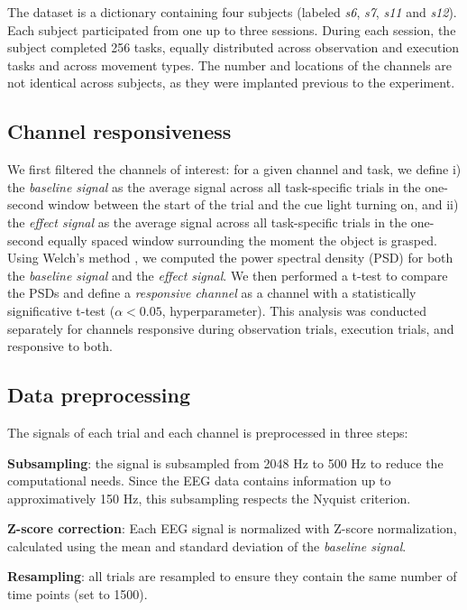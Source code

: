 \documentclass[10pt,conference,compsocconf]{IEEEtran}
\begin{document}
The dataset is a dictionary containing four subjects (labeled \textit{s6}, \textit{s7}, \textit{s11} and \textit{s12}). Each subject participated from one up to three sessions. During each session, the subject completed 256 tasks, equally distributed across observation and execution tasks and across movement types. The number and locations of the channels are not identical across subjects, as they were implanted previous to the experiment.

\subsection{Channel responsiveness}
\label{sec:channelresponsiveness}
We first filtered the channels of interest: for a given channel and task, we define i) the \textit{baseline signal} as the average signal across all task-specific trials in the one-second window between the start of the trial and the cue light turning on, and ii) the \textit{effect signal} as the average signal across all task-specific trials in the one-second equally spaced window surrounding the moment the object is grasped. Using Welch's method \cite{welch}, we computed the power spectral density (PSD) for both the \textit{baseline signal} and the \textit{effect signal}. We then performed a t-test to compare the PSDs and define a \textit{responsive channel} as a channel with a statistically significative t-test (\(\alpha<0.05\), hyperparameter). This analysis was conducted separately for channels responsive during observation trials, execution trials, and responsive to both.

\subsection{Data preprocessing}
\label{subsec:preproc}
The signals of each trial and each channel is preprocessed in three steps:
\begin{inlinearabic}[]
  \item \textbf{Subsampling}: the signal is subsampled from 2048 Hz to 500 Hz to reduce the computational needs. Since the EEG data contains information up to approximatively 150 Hz, this subsampling respects the Nyquist criterion.
  \item \textbf{Z-score correction}: Each EEG signal is normalized with Z-score normalization, calculated using the mean and standard deviation of the \textit{baseline signal}.
  \item \textbf{Resampling}: all trials are resampled to ensure they contain the same number of time points (set to 1500).
\end{inlinearabic}
\end{document}

